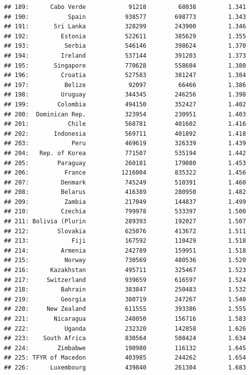 \documentclass[10pt,]{article}
\begin{document}
\begin{verbatim}
## 189:      Cabo Verde            91218         68038         1.341
## 190:           Spain           938577        698773         1.343
## 191:       Sri Lanka           328299        243900         1.346
## 192:         Estonia           522611        385629         1.355
## 193:          Serbia           546146        398624         1.370
## 194:         Ireland           537144        391203         1.373
## 195:       Singapore           770628        558604         1.380
## 196:         Croatia           527583        381247         1.384
## 197:          Belize            92097         66466         1.386
## 198:         Uruguay           344345        246256         1.398
## 199:        Colombia           494150        352427         1.402
## 200:  Dominican Rep.           323954        230951         1.403
## 201:           Chile           568781        401602         1.416
## 202:       Indonesia           569711        401892         1.418
## 203:            Peru           469619        326339         1.439
## 204:   Rep. of Korea           771507        535194         1.442
## 205:        Paraguay           260181        179080         1.453
## 206:          France          1216004        835322         1.456
## 207:         Denmark           745249        510391         1.460
## 208:         Belarus           416389        280950         1.482
## 209:          Zambia           217049        144837         1.499
## 210:         Czechia           799978        533397         1.500
## 211: Bolivia (Plurin           289393        192027         1.507
## 212:        Slovakia           625076        413672         1.511
## 213:            Fiji           167592        110429         1.518
## 214:         Armenia           242789        159951         1.518
## 215:          Norway           730569        480536         1.520
## 216:      Kazakhstan           495711        325467         1.523
## 217:     Switzerland           939659        616597         1.524
## 218:         Bahrain           383847        250483         1.532
## 219:         Georgia           380719        247267         1.540
## 220:     New Zealand           611555        393386         1.555
## 221:       Nicaragua           248050        156716         1.583
## 222:          Uganda           232320        142858         1.626
## 223:    South Africa           830564        508424         1.634
## 224:        Zimbabwe           190980        116132         1.645
## 225: TFYR of Macedon           403985        244262         1.654
## 226:      Luxembourg           439840        261304         1.683

\end{verbatim}
\end{document}
